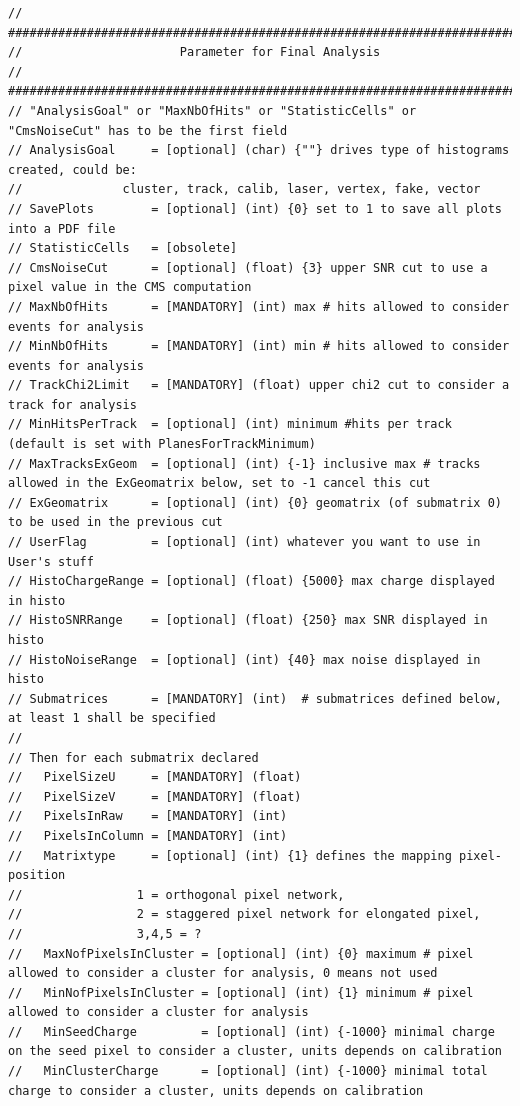 \documentclass[a4paper, 12pt, twoside]{article}
\begin{document}
\begin{verbatim}
// #############################################################################
//                      Parameter for Final Analysis
// #############################################################################
// "AnalysisGoal" or "MaxNbOfHits" or "StatisticCells" or "CmsNoiseCut" has to be the first field
// AnalysisGoal     = [optional] (char) {""} drives type of histograms created, could be:
//              cluster, track, calib, laser, vertex, fake, vector
// SavePlots        = [optional] (int) {0} set to 1 to save all plots into a PDF file
// StatisticCells   = [obsolete]
// CmsNoiseCut      = [optional] (float) {3} upper SNR cut to use a pixel value in the CMS computation
// MaxNbOfHits      = [MANDATORY] (int) max # hits allowed to consider events for analysis
// MinNbOfHits      = [MANDATORY] (int) min # hits allowed to consider events for analysis
// TrackChi2Limit   = [MANDATORY] (float) upper chi2 cut to consider a track for analysis
// MinHitsPerTrack  = [optional] (int) minimum #hits per track (default is set with PlanesForTrackMinimum)
// MaxTracksExGeom  = [optional] (int) {-1} inclusive max # tracks allowed in the ExGeomatrix below, set to -1 cancel this cut
// ExGeomatrix      = [optional] (int) {0} geomatrix (of submatrix 0) to be used in the previous cut
// UserFlag         = [optional] (int) whatever you want to use in User's stuff
// HistoChargeRange = [optional] (float) {5000} max charge displayed in histo
// HistoSNRRange    = [optional] (float) {250} max SNR displayed in histo
// HistoNoiseRange  = [optional] (int) {40} max noise displayed in histo
// Submatrices      = [MANDATORY] (int)  # submatrices defined below, at least 1 shall be specified
//
// Then for each submatrix declared
//   PixelSizeU     = [MANDATORY] (float)
//   PixelSizeV     = [MANDATORY] (float)
//   PixelsInRaw    = [MANDATORY] (int)
//   PixelsInColumn = [MANDATORY] (int)
//   Matrixtype     = [optional] (int) {1} defines the mapping pixel-position
//                1 = orthogonal pixel network,
//                2 = staggered pixel network for elongated pixel,
//                3,4,5 = ?
//   MaxNofPixelsInCluster = [optional] (int) {0} maximum # pixel allowed to consider a cluster for analysis, 0 means not used
//   MinNofPixelsInCluster = [optional] (int) {1} minimum # pixel allowed to consider a cluster for analysis
//   MinSeedCharge         = [optional] (int) {-1000} minimal charge on the seed pixel to consider a cluster, units depends on calibration
//   MinClusterCharge      = [optional] (int) {-1000} minimal total charge to consider a cluster, units depends on calibration

\end{verbatim}
\end{document}
